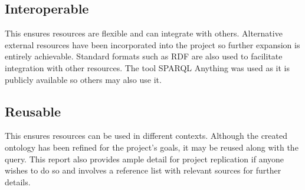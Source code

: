 \subsection{Interoperable}
\hspace{0.5cm} This ensures resources are flexible and can integrate with others. Alternative external resources have been incorporated into the project so further expansion is entirely achievable. Standard formats such as RDF are also used to facilitate integration with other resources. The tool SPARQL Anything was used as it is publicly available so others may also use it. 

\subsection{Reusable}
\hspace{0.5cm} This ensures resources can be used in different contexts. Although the created ontology has been refined for the project's goals, it may be reused along with the query. This report also provides ample detail for project replication if anyone wishes to do so and involves a reference list with relevant sources for further details. 
